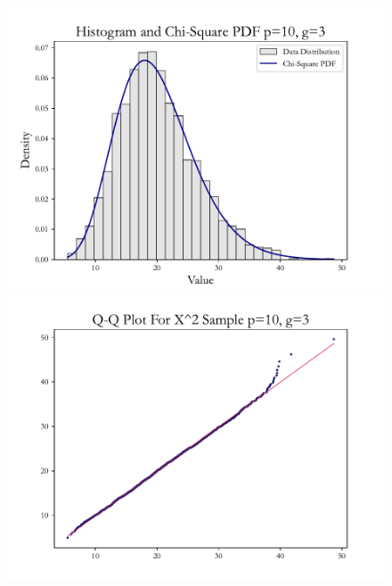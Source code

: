 \documentclass{article} %
\begin{document}
\begin{figure}[H]
    \centering
    \begin{minipage}[b]{0.49\textwidth}
        \centering
        \includegraphics[width=\textwidth]{img/b/hist_plot_p=10_g=3.pdf}
    \end{minipage}
    \hfill
    \begin{minipage}[b]{0.49\textwidth}
        \centering
        \includegraphics[width=\textwidth]{img/b/qq_plot_p=10_g=3.pdf}
    \end{minipage}
    \hfill
    \begin{minipage}[b]{0.49\textwidth}
        \centering

\end{minipage}
\end{figure}
\end{document}
